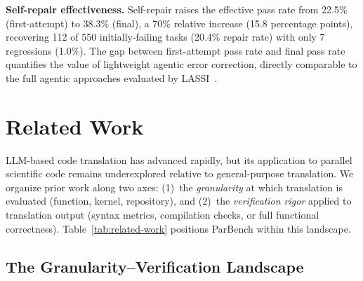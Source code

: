\documentclass[conference]{IEEEtran}
\begin{document}
\textbf{Self-repair effectiveness.} Self-repair raises the effective pass rate from 22.5\% (first-attempt) to 38.3\% (final), a 70\% relative increase (15.8 percentage points), recovering 112 of 550 initially-failing tasks (20.4\% repair rate) with only 7 regressions (1.0\%). The gap between first-attempt pass rate and final pass rate quantifies the value of lightweight agentic error correction, directly comparable to the full agentic approaches evaluated by LASSI~\cite{LASSI2024}.

\section{Related Work}
\label{sec:related-work}

LLM-based code translation has advanced rapidly, but its application to parallel scientific code remains underexplored relative to general-purpose translation. We organize prior work along two axes: (1)~the \emph{granularity} at which translation is evaluated (function, kernel, repository), and (2)~the \emph{verification rigor} applied to translation output (syntax metrics, compilation checks, or full functional correctness). Table~\ref{tab:related-work} positions ParBench within this landscape.

\subsection{The Granularity--Verification Landscape}
\label{sec:granularity-verification}
\end{document}
